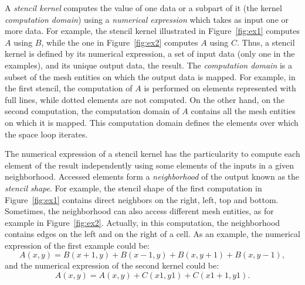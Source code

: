 
A \emph{stencil kernel} computes the value of one data or a subpart of it (the kernel \emph{computation domain}) using a \emph{numerical expression} which takes as input one or more data.
For example, the stencil kernel illustrated in Figure~\ref{fig:ex1} computes $A$ using $B$, while the one in Figure~\ref{fig:ex2} computes $A$ using $C$. Thus, a stencil kernel is defined by its numerical expression, a set of input data (only one in the examples), and its unique output data, the result. 
The \emph{computation domain} is a subset of the mesh entities on which the output data is mapped. For example, in the first stencil, the computation of $A$ is performed on elements represented with full lines, while dotted elements are not computed. On the other hand, on the second computation, the computation domain of $A$ contains all the mesh entities on which it is mapped. This computation domain defines the elements over which the space loop iterates.

The numerical expression of a stencil kernel has the particularity to compute each element of the result independently using some elements of the inputs in a given neighborhood.
Accessed elements form a \emph{neighborhood} of the output known as the \emph{stencil shape}. For example, the stencil shape of the first computation in Figure~\ref{fig:ex1} contains direct neighbors on the right, left, top and bottom. Sometimes, the neighborhood can also access different mesh entities, as for example in Figure~\ref{fig:ex2}. Actually, in this computation, the neighborhood contains edges on the left and on the right of a cell. As an example, the numerical expression of the first example could be:
\begin{equation*} 
A(x,y) = B(x+1,y)+B(x-1,y)+B(x,y+1)+B(x,y-1),
\end{equation*}
and the numerical expression of the second kernel could be:
\begin{equation*} 
A(x,y) = A(x,y)+C(x1,y1)+C(x1+1,y1).
\end{equation*}

